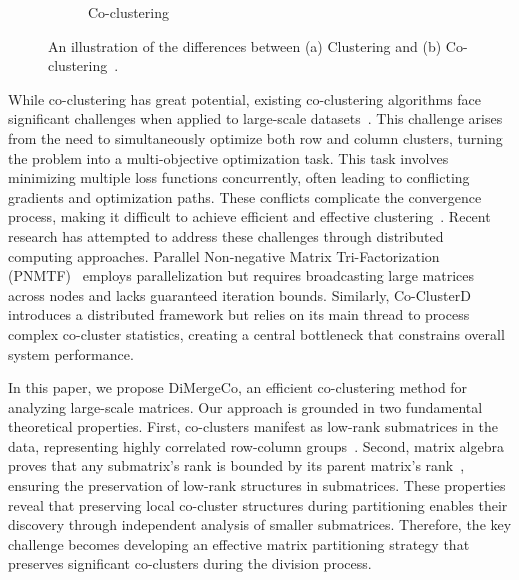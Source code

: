 \documentclass[journal]{IEEEtran}
\renewcommand{\cite}[1]{~\autocite{#1}}
\begin{document}
\begin{figure}[t]
\begin{subfigure}[b]{0.22\textwidth}
        \caption{Co-clustering}
        \label{fig:cocluster}
    \end{subfigure}
    \caption{An illustration of the differences between (a) Clustering and (b) Co-clustering\cite{yan2017CoclusteringMultidimensionalBig}.}
    \label{fig:cocomparison}
\end{figure}

While co-clustering has great potential, existing co-clustering algorithms face significant challenges when applied to large-scale datasets\cite{cheng2015CoClusterDDistributedFramework}. This challenge arises from the need to simultaneously optimize both row and column clusters, turning the problem into a multi-objective optimization task. This task involves minimizing multiple loss functions concurrently, often leading to conflicting gradients and optimization paths. These conflicts complicate the convergence process, making it difficult to achieve efficient and effective clustering\cite{coello2007EvolutionaryAlgorithmsSolving}. Recent research has attempted to address these challenges through distributed computing approaches. Parallel Non-negative Matrix Tri-Factorization (PNMTF)\cite{chen2023ParallelNonNegativeMatrix} employs parallelization but requires broadcasting large matrices across nodes and lacks guaranteed iteration bounds. Similarly, Co-ClusterD\cite{cheng2015CoClusterDDistributedFramework} introduces a distributed framework but relies on its main thread to process complex co-cluster statistics, creating a central bottleneck that constrains overall system performance.

In this paper, we propose DiMergeCo, an efficient co-clustering method for analyzing large-scale matrices. Our approach is grounded in two fundamental theoretical properties. First, co-clusters manifest as low-rank submatrices in the data, representing highly correlated row-column groups\cite{zhao2016IdentifyingMultidimensionalCoclusters,wu2024ScalableCoClusteringLargeScale}. Second, matrix algebra proves that any submatrix's rank is bounded by its parent matrix's rank\cite{horn1985MatrixAnalysis}, ensuring the preservation of low-rank structures in submatrices. These properties reveal that preserving local co-cluster structures during partitioning enables their discovery through independent analysis of smaller submatrices. Therefore, the key challenge becomes developing an effective matrix partitioning strategy that preserves significant co-clusters during the division process.
\end{document}
